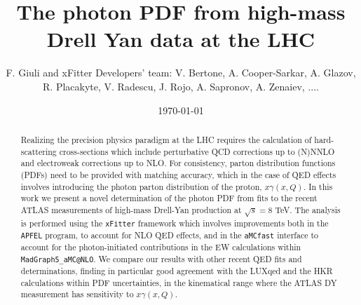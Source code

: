 \documentclass[english,aps]{revtex4-1}
\begin{document}
\linenumbers

\title{The photon PDF from high-mass Drell Yan data at the LHC}

\author{F. Giuli and xFitter Developers' team: V. Bertone, A. Cooper-Sarkar, A. Glazov, R. Placakyte, V. Radescu,  J. Rojo, A. Sapronov, A. Zenaiev, .... }

\date{\today}
\begin{abstract}
  Realizing the precision physics paradigm at the LHC requires the calculation
   of  hard-scattering
   cross-sections which include perturbative QCD corrections up to (N)NNLO
   and electroweak corrections up to NLO.
   For consistency, parton distribution functions (PDFs) need to be provided
   with matching accuracy, which in the case of QED effects involves introducing
   the photon parton distribution of the proton, $x\gamma(x,Q)$.
   In this work we present a novel determination of the photon PDF from fits to 
   the recent ATLAS measurements of high-mass Drell-Yan production at $\sqrt{s}=8$ TeV.
  The analysis is  performed  using the {\tt xFitter} framework which involves
  improvements both in the {\tt APFEL} program, to account for NLO QED effects,
  and in the {\tt aMCfast} interface to account for the  photon-initiated contributions
  in the EW calculations within {\tt MadGraph5\_aMC@NLO}.
  We compare our results with other recent QED fits
  and determinations, finding in particular
  good agreement with the LUXqed and the HKR calculations within PDF uncertainties,
  in the kinematical range where the ATLAS DY measurement has sensitivity to
  $x\gamma(x,Q)$.
\end{abstract}
\maketitle

\tableofcontents{}












\end{document}
